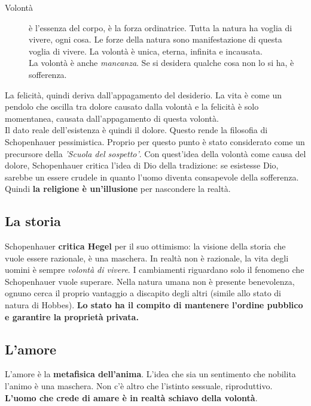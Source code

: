 \begin{description}
  \item[Volontà] è l'essenza del corpo, è la forza ordinatrice. Tutta la natura ha voglia di vivere,
    ogni cosa. Le forze della natura sono manifestazione di questa voglia di vivere. La volontà
    è unica, eterna, infinita e incausata.\\
    La volontà è anche \textit{mancanza}. Se si desidera qualche cosa non lo si ha, è sofferenza.
\end{description}

La felicità, quindi deriva dall'appagamento del desiderio. La vita è come un pendolo che oscilla tra 
dolore causato dalla volontà e la felicità è solo momentanea, causata dall'appagamento di questa
volontà.\\
Il dato reale dell'esistenza è quindi il dolore. Questo rende la filosofia di Schopenhauer 
pessimistica. Proprio per questo punto è stato considerato come un precursore della \textit{'Scuola
del sospetto'}. Con quest'idea della volontà come causa del dolore, Schopenhauer critica l'idea di
Dio della tradizione: se esistesse Dio, sarebbe un essere crudele in quanto l'uomo diventa
consapevole della sofferenza. 
Quindi \textbf{la religione è un'illusione} per nascondere la realtà.

\subsection{La storia}
Schopenhauer \textbf{critica Hegel} per il suo ottimismo: la visione della storia che vuole essere
razionale, è una maschera. In realtà non è razionale, la vita degli uomini è sempre \textit{volontà
di vivere}. I cambiamenti riguardano solo il fenomeno che Schopenhauer vuole superare. Nella natura
umana non è presente benevolenza, ognuno cerca il proprio vantaggio a discapito degli altri (simile
allo stato di natura di Hobbes). \textbf{Lo stato ha il compito di mantenere l'ordine pubblico e 
garantire la proprietà privata.}

\subsection{L'amore}
L'amore è la \textbf{metafisica dell'anima}. L'idea che sia un sentimento che nobilita l'animo
è una maschera. Non c'è altro che l'istinto sessuale, riproduttivo. \textbf{L'uomo che crede di amare
è in realtà schiavo della volontà}.

